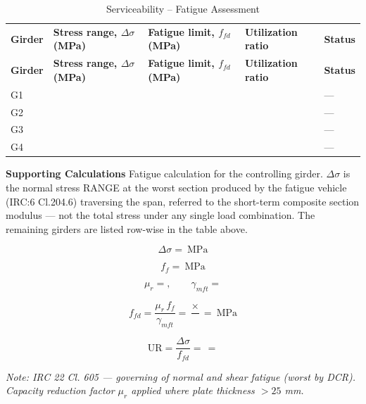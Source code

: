 \documentclass[12pt,a4paper]{report}
\numberwithin{figure}{chapter}
\begin{document}
\vspace{1em}
\begin{longtable}{|C{2.31cm}|C{3.02cm}|C{2.68cm}|C{2.9cm}|C{2.31cm}|}
\caption{Serviceability -- Fatigue Assessment}\\
\hline
\textbf{Girder} & \textbf{Stress range, $\Delta\sigma$ (MPa)} & \textbf{Fatigue limit, $f_{fd}$ (MPa)} & \textbf{Utilization ratio} & \textbf{Status} \\
\hline
\endfirsthead
\hline
\textbf{Girder} & \textbf{Stress range, $\Delta\sigma$ (MPa)} & \textbf{Fatigue limit, $f_{fd}$ (MPa)} & \textbf{Utilization ratio} & \textbf{Status} \\
\hline
\endhead
G1 &  &  &  & --- \\
\hline
G2 &  &  &  & --- \\
\hline
G3 &  &  &  & --- \\
\hline
G4 &  &  &  & --- \\
\hline
\end{longtable}

    \medskip
    \noindent\textbf{Supporting Calculations}
    \small
    Fatigue calculation for the controlling girder. $\Delta\sigma$ is the
    normal stress RANGE at the worst section produced by the fatigue vehicle
    (IRC:6 Cl.204.6) traversing the span, referred to the short-term composite
    section modulus --- not the total stress under any single load combination.
    The remaining girders are listed row-wise in the table above.

    \normalsize

    \[
    \Delta\sigma = \ \mathrm{MPa}
    \]

    \[
    f_f = \ \mathrm{MPa}
    \]

    \[
    \mu_r = , \qquad
    \gamma_{mft} = 
    \]

    \[
    f_{fd}
    =
    \frac{\mu_r\,f_f}{\gamma_{mft}}
    =
    \frac{\times}
        {}
    =
    
    \ \mathrm{MPa}
    \]

    \[
    \mathrm{UR}
    =
    \frac{\Delta\sigma}{f_{fd}}
    =
    \frac{}
        {}
    =
    
    \]
    
\noindent\textit{Note: IRC 22 Cl. 605 --- governing of normal and shear fatigue (worst by DCR). Capacity reduction factor $\mu_r$ applied where plate thickness $> 25$ mm.}
\end{document}
